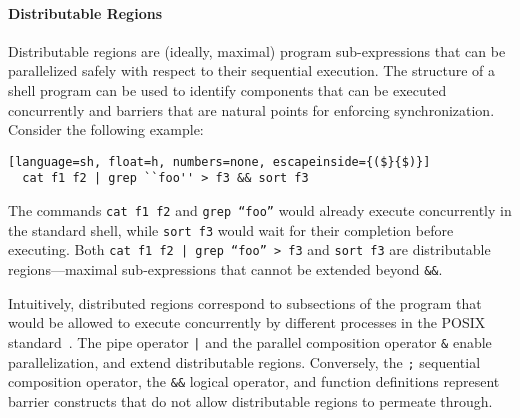 \documentclass[sigplan,10pt,review,anonymous]{acmart}
\newcommand{\ttt}[1]{\texttt{\small #1}}
\newcommand{\kk}[1]{[{\color{magenta}#1 --- kk}]}
\newcommand{\tr}[1]{} %
\begin{document}
\paragraph{Distributable Regions}
%
%
Distributable regions are (ideally, maximal) program sub-expressions that can be parallelized safely with respect to their sequential execution.
The structure of a shell program can be used to identify components that can be executed concurrently and barriers that are natural points for enforcing synchronization.
Consider the following example:

\begin{lstlisting}[language=sh, float=h, numbers=none, escapeinside={($}{$)}]
  cat f1 f2 | grep ``foo'' > f3 && sort f3 
\end{lstlisting}

\noindent
The commands \ttt{cat f1 f2} and \ttt{grep ``foo''} would already execute concurrently in the standard shell, while \ttt{sort f3} would wait for their completion before executing.
Both \ttt{cat f1 f2 | grep ``foo'' > f3} and \ttt{sort f3} are distributable regions---maximal sub-expressions that cannot be extended beyond \ttt{\&\&}.

Intuitively, distributed regions correspond to subsections of the program that would be allowed to execute concurrently by different processes in the POSIX standard~\cite{posix}.
The pipe operator \ttt{|} and the parallel composition operator \ttt{\&} enable parallelization, and extend distributable regions.
Conversely, the \ttt{;} sequential composition operator, the \ttt{\&\&} logical operator, and function definitions represent barrier constructs that do not allow distributable regions to permeate through.

% 
% 
% 
\end{document}
